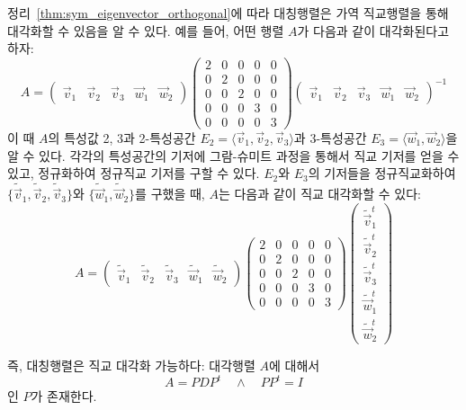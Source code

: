 \documentclass[../engineering_mathematics_lecture_note.tex]{subfiles}
\begin{document}
\begin{remark}
    정리~\ref{thm:sym_eigenvector_orthogonal}에 따라 대칭행렬은 가역 직교행렬을 통해 대각화할 수 있음을 알 수 있다.
    예를 들어, 어떤 행렬 $A$가 다음과 같이 대각화된다고 하자:
    \begin{equation*}
        A =
        \begin{pmatrix}
            \vec v_1 & \vec v_2 & \vec v_3 & \vec w_1 & \vec w_2
        \end{pmatrix}
        \begin{pmatrix}
            2 & 0 & 0 & 0 & 0\\
            0 & 2 & 0 & 0 & 0\\
            0 & 0 & 2 & 0 & 0\\
            0 & 0 & 0 & 3 & 0\\
            0 & 0 & 0 & 0 & 3
        \end{pmatrix}
        \begin{pmatrix}
            \vec v_1 & \vec v_2 & \vec v_3 & \vec w_1 & \vec w_2
        \end{pmatrix}^{-1}
    \end{equation*}
    이 때 $A$의 특성값 2, 3과 2-특성공간 $E_2 = \langle \vec v_1, \vec v_2, \vec v_3 \rangle$과 3-특성공간 $E_3 = \langle \vec w_1, \vec w_2\rangle$을 알 수 있다.
    각각의 특성공간의 기저에 그람-슈미트 과정을 통해서 직교 기저를 얻을 수 있고, 정규화하여 정규직교 기저를 구할 수 있다.
    $E_2$와 $E_3$의 기저들을 정규직교화하여 $\{\tilde{\vec v}_1, \tilde{\vec v}_2, \tilde{\vec v}_3\}$와 $\{\tilde{\vec w}_1, \tilde{\vec w}_2\}$를 구했을 때, $A$는 다음과 같이 직교 대각화할 수 있다:
    \begin{equation*}
        A =
        \begin{pmatrix}
            \tilde{\vec{v}}_1 & \tilde{\vec{v}}_2 & \tilde{\vec{v}}_3 & \tilde{\vec{w}}_1 & \tilde{\vec{w}}_2
        \end{pmatrix}
        \begin{pmatrix}
            2 & 0 & 0 & 0 & 0\\
            0 & 2 & 0 & 0 & 0\\
            0 & 0 & 2 & 0 & 0\\
            0 & 0 & 0 & 3 & 0\\
            0 & 0 & 0 & 0 & 3
        \end{pmatrix}
        \begin{pmatrix}
            \tilde{\vec{v}}_1^t \\ \tilde{\vec{v}}_2^t \\ \tilde{\vec{v}}_3^t \\ \tilde{\vec{w}}_1^t \\ \tilde{\vec{w}}_2^t
        \end{pmatrix}
    \end{equation*}
    
    즉, 대칭행렬은 직교 대각화 가능하다:
    대각행렬 $A$에 대해서
    \begin{equation*}
        A = PDP^t \quad \wedge \quad PP^t = I
    \end{equation*}
    인 $P$가 존재한다.
\end{remark}
\end{document}
